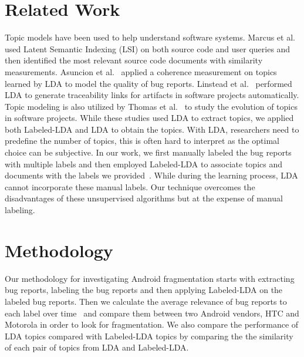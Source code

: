 \documentclass[10pt, conference, compsocconf]{IEEEtran}
\begin{document}



\section{Related Work}
\label{sec:relatedwork}
Topic models have been used to help understand software systems. 
Marcus et al.~\cite{Marcus04aninformation} used Latent Semantic
Indexing (LSI) on both source code and user queries and then
identified the most relevant source code documents with similarity
measurements. 
Asuncion et al.~\cite{Asuncion:2010} applied a coherence measurement
on topics learned by LDA to model the quality of bug reports. 
Linstead et al.~\cite{Linstead:2009} performed LDA to generate traceability links for artifacts in software projects automatically. Topic modeling is also utilized by Thomas et al.~\cite{Thomas:2011} to study the evolution of topics in software projects.
While these studies used 
 LDA to extract topics,  we applied both Labeled-LDA and LDA to
obtain the topics. 
With LDA, researchers need to predefine the number of topics, this is
often hard to interpret as the optimal choice can be subjective.
In our work, we first manually labeled the bug reports with multiple
labels and then employed
Labeled-LDA to associate topics and documents with the labels we
provided~\cite{labeledlda}. 
While during the learning process, LDA cannot incorporate these manual
labels. 
Our technique
overcomes the disadvantages of these
unsupervised algorithms but at the expense of manual labeling.


\section{Methodology}
\label{sec:methodology}

Our methodology for investigating Android fragmentation starts with extracting
bug reports, labeling the bug reports and then applying
Labeled-LDA on the labeled bug reports.
Then 
 we calculate the average relevance of bug reports to each label
over time~\cite{Hindle} and compare them between two Android vendors,
HTC and Motorola in order to look for fragmentation.
We also compare the performance of LDA topics compared with
Labeled-LDA topics by comparing the 
the similarity of each pair of
topics from LDA and Labeled-LDA.
\end{document}
